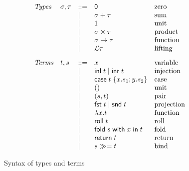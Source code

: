 \begin{figure}
  \small
  \[
  \begin{array}{lllll}
    \textit{Types} &
    \sigma, \tau
    & ::= &
    \mathsf{0}
    &
    \text{zero}
    \\
    && \mid &
    \sigma + \tau
    &
    \text{sum}
    \\
    && \mid &
    \mathsf{1}
    &
    \text{unit}
    \\
    && \mid &
    \sigma \times \tau
    &
    \text{product}
    \\
    && \mid &
    \sigma \to \tau
    &
    \text{function}
    \\
    && \mid &
    \mathcal{L}\tau
    &
    \text{lifting}
    \\[3mm]
    \textit{Terms} &
    t, s
    & ::= &
    x
    &
    \text{variable}
    \\
    && \mid &
    \mathsf{inl}\;t \mid \mathsf{inr}\;t
    &
    \text{injection}
    \\
    && \mid &
    \mathsf{case}\;t\;\{x.s_1; y.s_2\}
    &
    \text{case}
    \\
    && \mid &
    ()
    &
    \text{unit}
    \\
    && \mid &
    (s,t)
    &
    \text{pair}
    \\
    && \mid &
    \mathsf{fst}\;t \mid \mathsf{snd}\;t
    &
    \text{projection}
    \\
    && \mid &
    \lambda x.t
    &
    \text{function}
    \\
    && \mid &
    \mathsf{roll}\;t
    &
    \text{roll}
    \\
    && \mid &
    \mathsf{fold}\;s\;\mathsf{with}\;x\;\mathsf{in}\;t
    &
    \text{fold}
    \\
    && \mid &
    \mathsf{return}\;t
    &
    \text{return}
    \\
    && \mid &
    {s}\gg={t}
    &
    \text{bind}
  \end{array}
  \]
  \caption{Syntax of types and terms}
  \label{fig:syntax}
\end{figure}
